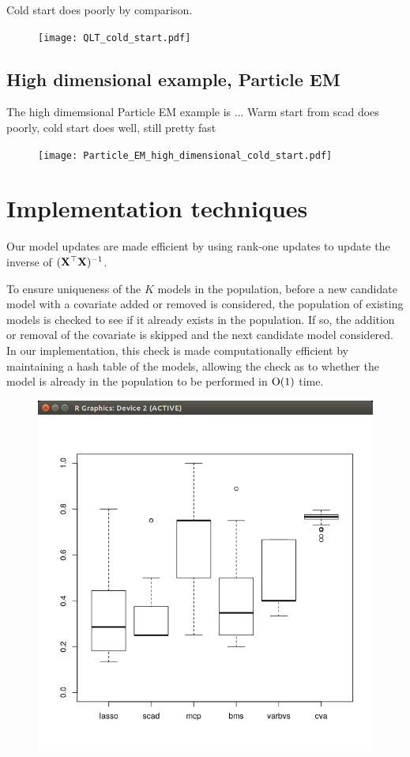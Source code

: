 \documentclass{amsart}[12pt]
\begin{document}
Cold start does poorly by comparison.
\begin{figure}
\texttt{[image: QLT\_cold\_start.pdf]}
\end{figure}

\subsection{High dimensional example, Particle EM}
The high dimemsional Particle EM example is ...
Warm start from scad does poorly, cold start does well, still pretty fast
\begin{figure}
\texttt{[image: Particle\_EM\_high\_dimensional\_cold\_start.pdf]}
\end{figure}

\section{Implementation techniques}
Our model updates are made efficient by using rank-one updates to update the inverse of $({\bf X}^\top {\bf X})^{-1}$.

To ensure uniqueness of the $K$ models in the population, before a new candidate model with a covariate added
or removed is considered, the population of existing models is checked to see if it already exists in the
population. If so, the addition or removal of the covariate is skipped and the next candidate model considered.
In our implementation, this check is made computationally efficient by maintaining a hash table of the models,
allowing the check as to whether the model is already in the population to be performed in $\text{O}(1)$ time.

\begin{figure}
\includegraphics{Particle_EM_high_dimensional_cold_start.png}
\end{figure}



\end{document}
